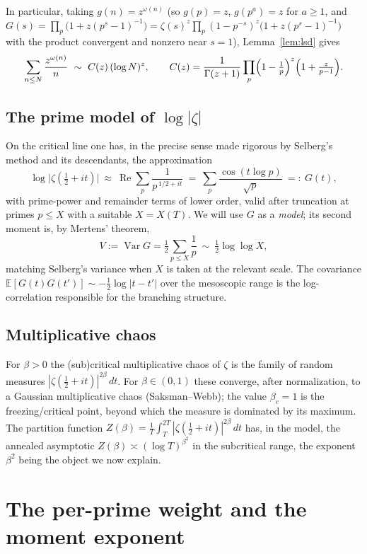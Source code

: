 \documentclass[11pt]{amsart}
\theoremstyle{definition}
\newcommand{\Ee}{\mathbb E}
\newcommand{\re}{\operatorname{Re}}
\newcommand{\Var}{\operatorname{Var}}
\newcommand{\half}{\tfrac12}
\newcommand{\loglog}{\log\log}
\begin{document}
In particular, taking $g(n)=z^{\omega(n)}$ (so $g(p)=z$, $g(p^a)=z$ for $a\ge1$, and
$G(s)=\prod_p\bigl(1+z(p^s-1)^{-1}\bigr)=\zeta(s)^z\prod_p(1-p^{-s})^{z}\bigl(1+z(p^s-1)^{-1}\bigr)$ with the
product convergent and nonzero near $s=1$), Lemma~\ref{lem:lsd} gives
\begin{equation}\label{eq:zomega}
\sum_{n\le N}\frac{z^{\omega(n)}}{n}\ \sim\ C(z)\,(\log N)^{z},\qquad
C(z)=\frac{1}{\Gamma(z+1)}\prod_p\Bigl(1-\tfrac1p\Bigr)^{z}\Bigl(1+\tfrac{z}{p-1}\Bigr).
\end{equation}

\subsection{The prime model of $\log|\zeta|$}
On the critical line one has, in the precise sense made rigorous by Selberg's method and its descendants, the
approximation
\[
\log\bigl|\zeta(\half+it)\bigr|\ \approx\ \re\sum_{p}\frac{1}{p^{\,1/2+it}}\ =\ \sum_{p}\frac{\cos(t\log p)}{\sqrt p}\ =:\ G(t),
\]
with prime-power and remainder terms of lower order, valid after truncation at primes $p\le X$ with a
suitable $X=X(T)$. We will use $G$ as a \emph{model}; its second moment is, by Mertens' theorem,
\begin{equation}\label{eq:variance}
V:=\Var G=\half\sum_{p\le X}\frac1p\ \sim\ \half\loglog X,
\end{equation}
matching Selberg's variance when $X$ is taken at the relevant scale. The covariance
$\Ee[G(t)G(t')]\sim-\half\log|t-t'|$ over the mesoscopic range is the log-correlation responsible for the
branching structure.

\subsection{Multiplicative chaos}
For $\beta>0$ the (sub)critical multiplicative chaos of $\zeta$ is the family of random measures
$|\zeta(\half+it)|^{2\beta}\,dt$. For $\beta\in(0,1)$ these converge, after normalization, to a Gaussian
multiplicative chaos (Saksman--Webb); the value $\beta_c=1$ is the freezing/critical point, beyond which the
measure is dominated by its maximum. The partition function
$Z(\beta)=\frac1T\int_T^{2T}|\zeta(\half+it)|^{2\beta}\,dt$ has, in the model, the annealed asymptotic
$Z(\beta)\asymp(\log T)^{\beta^2}$ in the subcritical range, the exponent $\beta^2$ being the object we now
explain.

\section{The per-prime weight and the moment exponent}\label{sec:weight}
\end{document}

